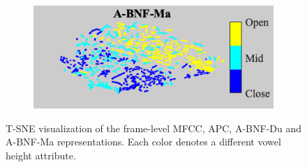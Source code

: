 \documentclass[transmag]{IEEEtran}
\begin{document}
\begin{figure}[!t]
\begin{subfigure}{0.495\linewidth}
	   \centering
	   \includegraphics[width=1\linewidth]{Rtsne_af_height_bnf_aidatatang_apc_input_disc_bar_adjust_journal.png}
    \end{subfigure}
    \caption{T-SNE visualization of the frame-level MFCC, APC, A-BNF-Du and A-BNF-Ma representations. Each color denotes a different vowel height attribute.}
        \label{fig:analysis_tsne_vowel_height}
\end{figure}
\end{document}
